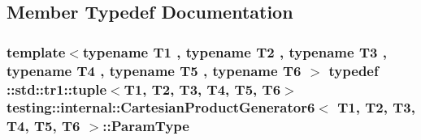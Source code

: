 \subsection{Member Typedef Documentation}
\hypertarget{classtesting_1_1internal_1_1_cartesian_product_generator6_a308164858b18868e45abab2f168b92db}{
\subsubsection[{Param\-Type}]{\setlength{\rightskip}{0pt plus 5cm}template$<$typename T1 , typename T2 , typename T3 , typename T4 , typename T5 , typename T6 $>$ typedef \-::{\bf std\-::tr1\-::tuple}$<$T1, T2, T3, T4, T5, T6$>$ {\bf testing\-::internal\-::\-Cartesian\-Product\-Generator6}$<$ T1, T2, T3, T4, T5, T6 $>$\-::{\bf Param\-Type}}}\label{classtesting_1_1internal_1_1_cartesian_product_generator6_a308164858b18868e45abab2f168b92db}


